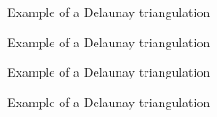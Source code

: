 \documentclass[lettersize,journal,english]{IEEEtran}
\begin{document}
\begin{figure}[!b]
    \centering
    \caption{Example of a Delaunay triangulation}
    \label{fig:crit_dis}
\end{figure}

\begin{figure}[!t]
    \centering
    \caption{Example of a Delaunay triangulation}
    \label{fig:crit_ang}
\end{figure}

\begin{figure}[!b]
    \centering
    \caption{Example of a Delaunay triangulation}
    \label{fig:crit_qua}
\end{figure}

\begin{figure}[!t]
    \centering
    \caption{Example of a Delaunay triangulation}
    \label{fig:crit_nei}
\end{figure}
\end{document}
